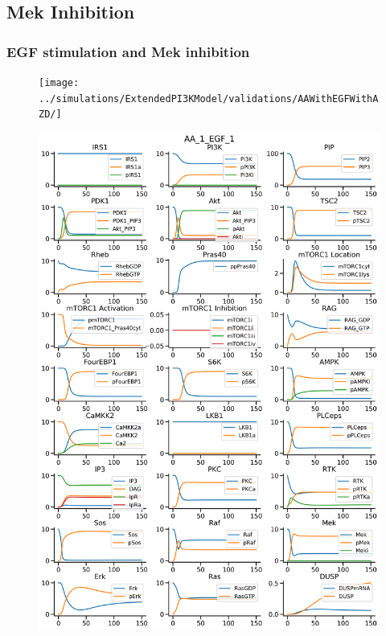 \documentclass{beamer}
\begin{document}
\subsection{Mek Inhibition}
\begin{frame}
\frametitle{EGF stimulation and Mek inhibition}
\begin{figure}
    \begin{minipage}{0.45\textwidth}
        \centering
        \texttt{[image: ../simulations/ExtendedPI3KModel/validations/AAWithEGFWithAZD/]}
    \end{minipage}
    \begin{minipage}{0.45\textwidth}
        \centering
        \includegraphics[width=\textwidth]{../simulations/ExtendedPI3KModel/validations/AAWithEGF/AA_1_EGF_1-3.png}
    \end{minipage}
\end{figure}
\end{frame}
\end{document}
